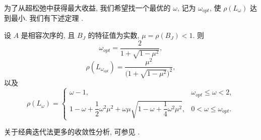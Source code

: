为了从超松弛中获得最大收益, 我们希望找一个最优的 $\omega$, 记为 $\omega_{opt}$, 使 $\rho(L_\omega)$ 达到最小. 我们有下述定理 \cite{src:30,src:85}.

\begin{theorem}
\label{thm:5-13}
设 $A$ 是相容次序的, 且 $B_J$ 的特征值为实数, $\mu=\rho(B_J)<1$. 则
\[
  \omega_{opt}=\frac{2}{1+\sqrt{1-\mu^2}},
\]
\[
  \rho(L_{\omega_{opt}})=\frac{\mu^2}{\bigl(1+\sqrt{1-\mu^2}\bigr)^2},
\]
以及
\[
  \rho(L_\omega)=
  \begin{cases}
    \omega-1, & \omega_{opt}\leqslant\omega<2,\\[6pt]
    1-\omega+\dfrac{1}{2}\omega^2\mu^2
    +\omega\mu\sqrt{1-\omega+\dfrac{1}{4}\omega^2\mu^2},
    & 0<\omega\leqslant\omega_{opt}.
  \end{cases}
\]
\end{theorem}

关于经典迭代法更多的收敛性分析, 可参见 \cite{src:14,src:74}.

